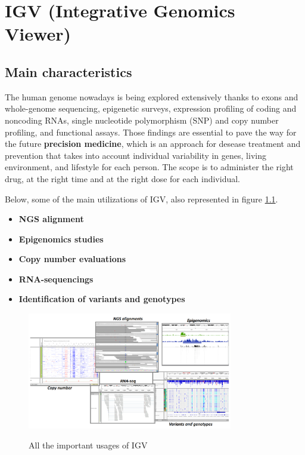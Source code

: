 \graphicspath{{chapters/IGVimages/}}

\chapter{IGV (Integrative Genomics Viewer)} \label{chap: IGV}

\section{Main characteristics}
The human genome nowadays is being explored extensively thanks to exons and
whole-genome sequencing, epigenetic surveys, expression profiling of coding and
noncoding RNAs, single nucleotide polymorphism (SNP) and copy number profiling,
and functional assays. Those findings are essential to pave the way for the
future \textbf{precision medicine}, which is an approach for desease treatment
and prevention that takes into account individual variability in genes, living
environment, and lifestyle for each person. The scope is to administer the right
drug, at the right time and at the right dose for each individual. 

Below, some of the main utilizations of IGV, also represented in figure
\ref*{IGVusages}.
\begin{itemize}
  \item \textbf{NGS alignment}
  \item \textbf{Epigenomics studies}
  \item \textbf{Copy number evaluations}
  \item \textbf{RNA-sequencings}
  \item \textbf{Identification of variants and genotypes}
\end{itemize}

\begin{figure}[H]
    \caption{All the important usages of IGV}
    \centering
    \includegraphics[width=0.8\textwidth]{usagesIGV.PNG}
    \label{IGVusages}
\end{figure}

